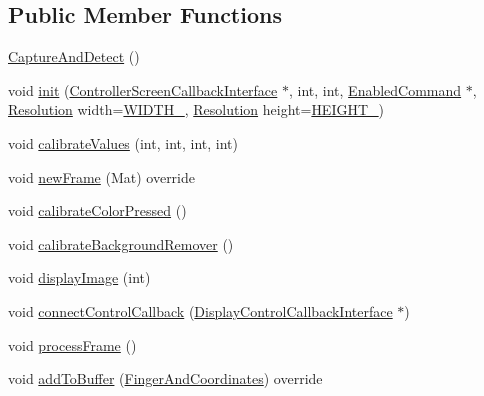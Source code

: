 \subsection*{Public Member Functions}
\begin{DoxyCompactItemize}
\item 
\hyperlink{class_gestro_1_1_capture_and_detect_a26c41eaa5100975ec0f50c97592f4bf1}{Capture\+And\+Detect} ()
\item 
void \hyperlink{class_gestro_1_1_capture_and_detect_a1df110dc696cebc95eb5d7ead2d74447}{init} (\hyperlink{class_controller_screen_callback_interface}{Controller\+Screen\+Callback\+Interface} $\ast$, int, int, \hyperlink{class_gesture_detection_1_1_enabled_command}{Enabled\+Command} $\ast$, \hyperlink{_capture_and_detect_8h_a3c1fc1369ee351f25804c8cde5e85ac3}{Resolution} width=\hyperlink{_capture_and_detect_8h_a3c1fc1369ee351f25804c8cde5e85ac3a278580710dc7c233b4035c222f100b9f}{W\+I\+D\+T\+H\+\_}, \hyperlink{_capture_and_detect_8h_a3c1fc1369ee351f25804c8cde5e85ac3}{Resolution} height=\hyperlink{_capture_and_detect_8h_a3c1fc1369ee351f25804c8cde5e85ac3aaf8940bab7f04c8cd702f61c4d051f27}{H\+E\+I\+G\+H\+T\+\_})
\item 
void \hyperlink{class_gestro_1_1_capture_and_detect_aafb4f601f860dd38f514f6dd29a1d016}{calibrate\+Values} (int, int, int, int)
\item 
void \hyperlink{class_gestro_1_1_capture_and_detect_a7f18d1c58b2ae4241766b36aa27385e9}{new\+Frame} (Mat) override
\item 
void \hyperlink{class_gestro_1_1_capture_and_detect_ac60f9b1d192c043fa9b40c38fc5599e6}{calibrate\+Color\+Pressed} ()
\item 
void \hyperlink{class_gestro_1_1_capture_and_detect_a53065abfb6eed6c074ad4d3370b3f232}{calibrate\+Background\+Remover} ()
\item 
void \hyperlink{class_gestro_1_1_capture_and_detect_a3f1ba69514a2debbc6b2a03e76f31b65}{display\+Image} (int)
\item 
void \hyperlink{class_gestro_1_1_capture_and_detect_aa75e3ba836797d18aa02c72bbf975082}{connect\+Control\+Callback} (\hyperlink{class_gestro_1_1_display_control_callback_interface}{Display\+Control\+Callback\+Interface} $\ast$)
\item 
void \hyperlink{class_gestro_1_1_capture_and_detect_ac7e70bbcade4e0023541c556ee7cb34e}{process\+Frame} ()
\item 
void \hyperlink{class_gestro_1_1_capture_and_detect_af376ab5418f7b235ee181d574da71fd6}{add\+To\+Buffer} (\hyperlink{class_gesture_detection_1_1_finger_and_coordinates}{Finger\+And\+Coordinates}) override
\end{DoxyCompactItemize}
